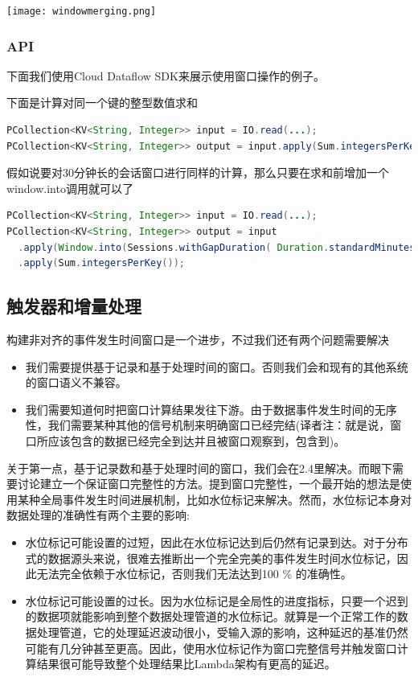 \documentclass[oneside]{ctexbook}
\begin{document}
\noindent \texttt{[image: windowmerging.png]}

\subsubsection{API}

下面我们使用Cloud Dataflow SDK来展示使用窗口操作的例子。

下面是计算对同一个键的整型数值求和

\begin{lstlisting}[language=java]
PCollection<KV<String, Integer>> input = IO.read(...);
PCollection<KV<String, Integer>> output = input.apply(Sum.integersPerKey());
\end{lstlisting}

假如说要对30分钟长的会话窗口进行同样的计算，那么只要在求和前增加一个window.into调用就可以了

\begin{lstlisting}[language=java]
PCollection<KV<String, Integer>> input = IO.read(...);
PCollection<KV<String, Integer>> output = input
  .apply(Window.into(Sessions.withGapDuration( Duration.standardMinutes(30))))
  .apply(Sum.integersPerKey());
\end{lstlisting}

\subsection{触发器和增量处理}

构建非对齐的事件发生时间窗口是一个进步，不过我们还有两个问题需要解决

\begin{itemize}
\item 我们需要提供基于记录和基于处理时间的窗口。否则我们会和现有的其他系统的窗口语义不兼容。
\item 我们需要知道何时把窗口计算结果发往下游。由于数据事件发生时间的无序性，我们需要某种其他的信号机制来明确窗口已经完结(译者注：就是说，窗口所应该包含的数据已经完全到达并且被窗口观察到，包含到)。
\end{itemize}

关于第一点，基于记录数和基于处理时间的窗口，我们会在2.4里解决。而眼下需要讨论建立一个保证窗口完整性的方法。提到窗口完整性，一个最开始的想法是使用某种全局事件发生时间进展机制，比如水位标记来解决。然而，水位标记本身对数据处理的准确性有两个主要的影响:

\begin{itemize}
\item 水位标记可能设置的过短，因此在水位标记达到后仍然有记录到达。对于分布式的数据源头来说，很难去推断出一个完全完美的事件发生时间水位标记，因此无法完全依赖于水位标记，否则我们无法达到100 \% 的准确性。
\item 水位标记可能设置的过长。因为水位标记是全局性的进度指标，只要一个迟到的数据项就能影响到整个数据处理管道的水位标记。就算是一个正常工作的数据处理管道，它的处理延迟波动很小，受输入源的影响，这种延迟的基准仍然可能有几分钟甚至更高。因此，使用水位标记作为窗口完整信号并触发窗口计算结果很可能导致整个处理结果比Lambda架构有更高的延迟。
\end{itemize}
\end{document}
